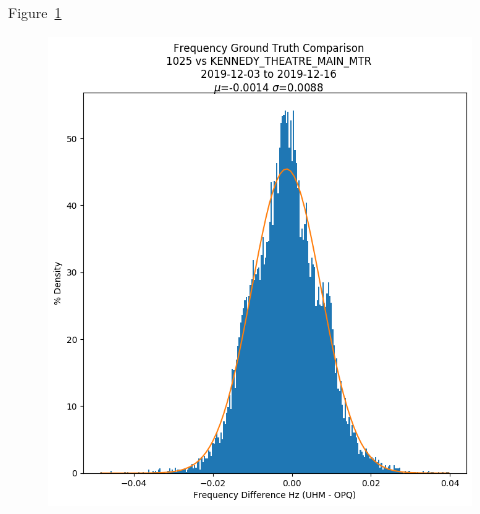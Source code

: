 Figure~\ref{fig:f_hist_1025_KENNEDY_THEATRE_MAIN_MTR}

\begin{figure}[H]
    \centering
    \includegraphics[width=\linewidth]{figures/f_hist_1025_KENNEDY_THEATRE_MAIN_MTR.png}
    \caption{}
    \label{fig:f_hist_1025_KENNEDY_THEATRE_MAIN_MTR}
\end{figure}
